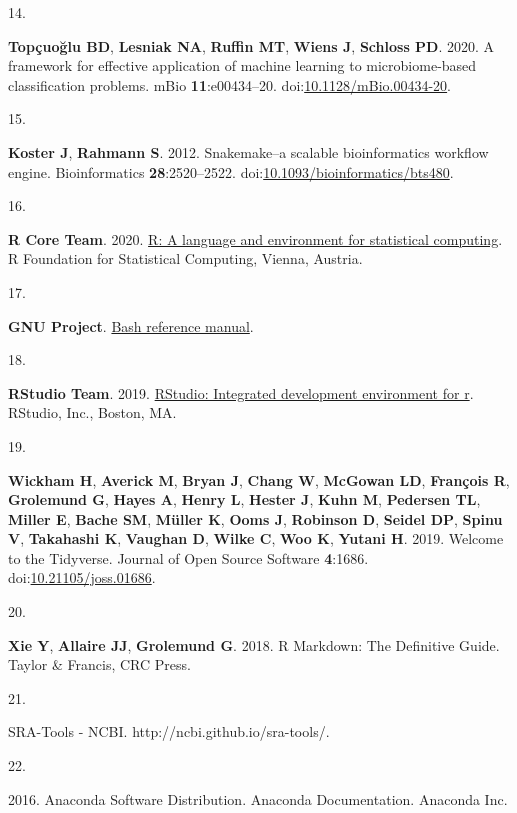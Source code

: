 \documentclass[
]{article}
\newlength{\cslhangindent}
\newlength{\csllabelwidth}
\newlength{\cslentryspacingunit} %
\newenvironment{CSLReferences}[2] %
 {%
  \setlength{\parindent}{0pt}
  \ifodd #1
  \let\oldpar\par
  \def\par{\hangindent=\cslhangindent\oldpar}
  \fi
  \setlength{\parskip}{#2\cslentryspacingunit}
 }%
 {}
\newcommand{\CSLLeftMargin}[1]{\parbox[t]{\csllabelwidth}{#1}}
\newcommand{\CSLRightInline}[1]{\parbox[t]{\linewidth - \csllabelwidth}{#1}\break}
\begin{document}
\begin{CSLReferences}{0}{1}
\leavevmode{}%
\CSLLeftMargin{14. }%
\CSLRightInline{\textbf{Topçuoğlu BD}, \textbf{Lesniak NA},
\textbf{Ruffin MT}, \textbf{Wiens J}, \textbf{Schloss PD}. 2020. A
framework for effective application of machine learning to
microbiome-based classification problems. mBio \textbf{11}:e00434--20.
doi:\href{https://doi.org/10.1128/mBio.00434-20}{10.1128/mBio.00434-20}.}

\leavevmode{}%
\CSLLeftMargin{15. }%
\CSLRightInline{\textbf{Koster J}, \textbf{Rahmann S}. 2012.
Snakemake--a scalable bioinformatics workflow engine. Bioinformatics
\textbf{28}:2520--2522.
doi:\href{https://doi.org/10.1093/bioinformatics/bts480}{10.1093/bioinformatics/bts480}.}

\leavevmode{}%
\CSLLeftMargin{16. }%
\CSLRightInline{\textbf{R Core Team}. 2020.
\href{https://www.R-project.org/}{R: A language and environment for
statistical computing}. R Foundation for Statistical Computing, Vienna,
Austria.}

\leavevmode{}%
\CSLLeftMargin{17. }%
\CSLRightInline{\textbf{GNU Project}.
\href{https://www.gnu.org/software/bash/\%20manual/bash.html/}{Bash
reference manual}.}

\leavevmode{}%
\CSLLeftMargin{18. }%
\CSLRightInline{\textbf{RStudio Team}. 2019.
\href{http://www.rstudio.com/}{RStudio: Integrated development
environment for r}. RStudio, Inc., Boston, MA.}

\leavevmode{}%
\CSLLeftMargin{19. }%
\CSLRightInline{\textbf{Wickham H}, \textbf{Averick M}, \textbf{Bryan
J}, \textbf{Chang W}, \textbf{McGowan LD}, \textbf{François R},
\textbf{Grolemund G}, \textbf{Hayes A}, \textbf{Henry L}, \textbf{Hester
J}, \textbf{Kuhn M}, \textbf{Pedersen TL}, \textbf{Miller E},
\textbf{Bache SM}, \textbf{Müller K}, \textbf{Ooms J}, \textbf{Robinson
D}, \textbf{Seidel DP}, \textbf{Spinu V}, \textbf{Takahashi K},
\textbf{Vaughan D}, \textbf{Wilke C}, \textbf{Woo K}, \textbf{Yutani H}.
2019. Welcome to the Tidyverse. Journal of Open Source Software
\textbf{4}:1686.
doi:\href{https://doi.org/10.21105/joss.01686}{10.21105/joss.01686}.}

\leavevmode{}%
\CSLLeftMargin{20. }%
\CSLRightInline{\textbf{Xie Y}, \textbf{Allaire JJ}, \textbf{Grolemund
G}. 2018. R {Markdown}: {The Definitive Guide}. {Taylor \& Francis, CRC
Press}.}

\leavevmode{}%
\CSLLeftMargin{21. }%
\CSLRightInline{{SRA}-{Tools} - {NCBI}.
http://ncbi.github.io/sra-tools/.}

\leavevmode{}%
\CSLLeftMargin{22. }%
\CSLRightInline{2016. Anaconda {Software Distribution}. Anaconda
Documentation. Anaconda Inc.}

\end{CSLReferences}
\end{document}
